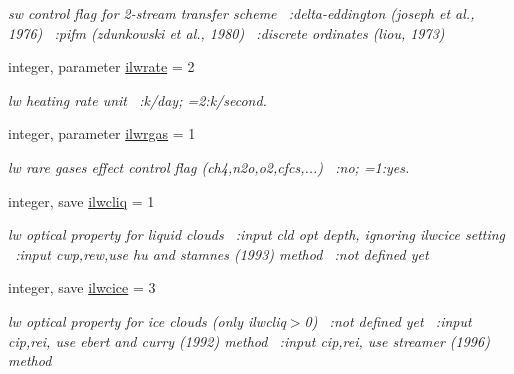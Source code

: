 \begin{DoxyCompactItemize}
\begin{DoxyCompactList}\small\item\em sw control flag for 2-\/stream transfer scheme ~\+:delta-\/eddington (joseph et al., 1976) ~\+:pifm (zdunkowski et al., 1980) ~\+:discrete ordinates (liou, 1973) \end{DoxyCompactList}\item 
integer, parameter \hyperlink{namespacephysparam_a8db5b34f68cb0e3698aa1c200fecd880}{ilwrate} = 2
\begin{DoxyCompactList}\small\item\em lw heating rate unit ~\+:k/day; =2\+:k/second. \end{DoxyCompactList}\item 
integer, parameter \hyperlink{namespacephysparam_a0658ae9417d6c79963e41e7d2a598309}{ilwrgas} = 1
\begin{DoxyCompactList}\small\item\em lw rare gases effect control flag (ch4,n2o,o2,cfcs,...) ~\+:no; =1\+:yes. \end{DoxyCompactList}\item 
integer, save \hyperlink{namespacephysparam_a7301d0d9b48fe408c5e67f2c145fbf7e}{ilwcliq} = 1
\begin{DoxyCompactList}\small\item\em lw optical property for liquid clouds ~\+:input cld opt depth, ignoring ilwcice setting ~\+:input cwp,rew,use hu and stamnes (1993) method ~\+:not defined yet \end{DoxyCompactList}\item 
integer, save \hyperlink{namespacephysparam_acf555c03fdb00286add9c3be7b43c32e}{ilwcice} = 3
\begin{DoxyCompactList}\small\item\em lw optical property for ice clouds (only ilwcliq$>$0) ~\+:not defined yet ~\+:input cip,rei, use ebert and curry (1992) method ~\+:input cip,rei, use streamer (1996) method ~\newline

\end{DoxyCompactList}
\end{DoxyCompactItemize}
